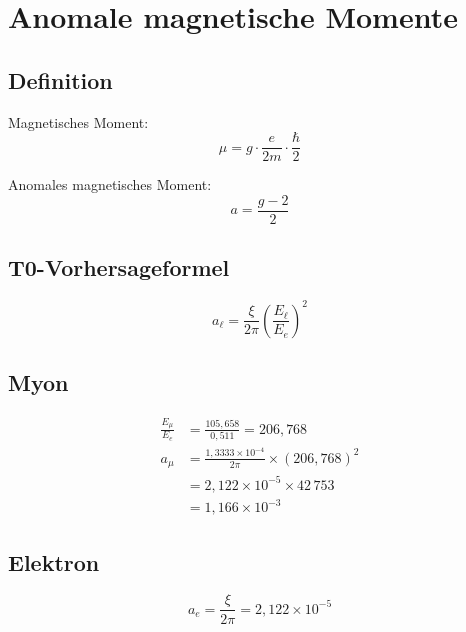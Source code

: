 	\section{Anomale magnetische Momente}
	\label{sec:g2}
	
	\subsection{Definition}
	
	Magnetisches Moment:
	\begin{equation}
		\mu = g \cdot \frac{e}{2m} \cdot \frac{\hbar}{2}
	\end{equation}
	
	Anomales magnetisches Moment:
	\begin{equation}
		a = \frac{g-2}{2}
	\end{equation}
	
	\subsection{T0-Vorhersageformel}
	
	\begin{equation}
		\boxed{a_\ell = \frac{\xi}{2\pi} \left(\frac{E_\ell}{E_e}\right)^2}
		\label{eq:g2_formula}
	\end{equation}
	
	\subsection{Myon}
	
	\begin{align}
		\frac{E_\mu}{E_e} &= \frac{105{,}658}{0{,}511} = 206{,}768 \\
		a_\mu &= \frac{1{,}3333 \times 10^{-4}}{2\pi} \times (206{,}768)^2 \\
		&= 2{,}122 \times 10^{-5} \times 42\,753 \\
		&= 1{,}166 \times 10^{-3}
	\end{align}
	
	\subsection{Elektron}
	
	\begin{equation}
		a_e = \frac{\xi}{2\pi} = 2{,}122 \times 10^{-5}
	\end{equation}
	
